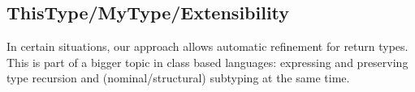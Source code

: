 
% 

\subsection{ThisType/MyType/Extensibility}

In certain situations, our approach allows automatic refinement for return
types. This is part of a bigger topic in class based languages: expressing and
preserving type recursion and (nominal/structural) subtyping at the same time.

